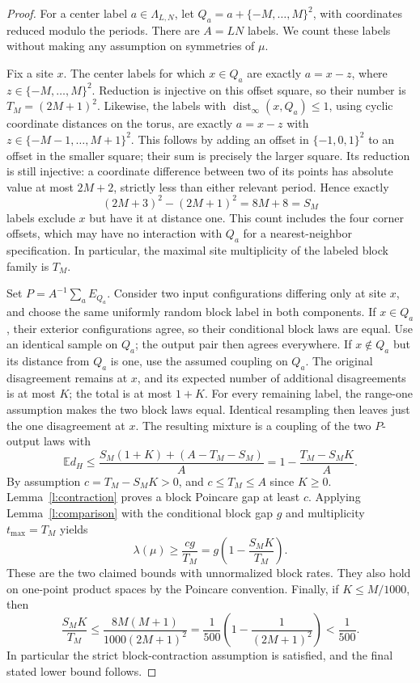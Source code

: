 \begin{proof}
For a center label \(a\in\Lambda_{L,N}\), let
\(Q_a=a+\{-M,\ldots,M\}^2\), with coordinates reduced modulo
the periods.  There are \(A=LN\) labels.  We count these labels
without making any assumption on symmetries of \(\mu\).

Fix a site \(x\).  The center labels for which \(x\in Q_a\) are
exactly \(a=x-z\), where \(z\in\{-M,\ldots,M\}^2\).
Reduction is injective on this offset square, so their number is
\(T_M=(2M+1)^2\).  Likewise, the labels with
\(\operatorname{dist}_\infty(x,Q_a)\le1\), using cyclic coordinate
distances on the torus, are exactly \(a=x-z\) with
\(z\in\{-M-1,\ldots,M+1\}^2\).  This follows by adding an
offset in \(\{-1,0,1\}^2\) to an offset in the smaller square;
their sum is precisely the larger square.  Its reduction is still
injective: a coordinate difference between two of its points has
absolute value at most \(2M+2\), strictly less than either relevant
period.  Hence exactly
\[
 (2M+3)^2-(2M+1)^2=8M+8=S_M
\]
labels exclude \(x\) but have it at distance one.  This count
includes the four corner offsets, which may have no interaction with
\(Q_a\) for a nearest-neighbor specification.  In particular, the
maximal site multiplicity of the labeled block family is \(T_M\).

Set \(P=A^{-1}\sum_aE_{Q_a}\).  Consider two input configurations
differing only at site \(x\), and choose the same uniformly random
block label in both components.  If \(x\in Q_a\), their exterior
configurations agree, so their conditional block laws are equal.
Use an identical sample on \(Q_a\); the output pair then agrees
everywhere.  If \(x\notin Q_a\) but its distance from \(Q_a\)
is one, use the assumed coupling on \(Q_a\).  The original
disagreement remains at \(x\), and its expected number of additional
disagreements is at most \(K\); the total is at most \(1+K\).
For every remaining label, the range-one assumption makes the two
block laws equal.  Identical resampling then leaves just the one
disagreement at \(x\).  The resulting mixture is a coupling of
the two \(P\)-output laws with
\[
 \mathbb E d_H
    \le\frac{S_M(1+K)+(A-T_M-S_M)}A
    =1-\frac{T_M-S_MK}A.
\]
By assumption \(c=T_M-S_MK>0\), and
\(c\le T_M\le A\) since \(K\ge0\).
Lemma~\ref{l:contraction} proves a block Poincare gap at least \(c\).
Applying Lemma~\ref{l:comparison} with the conditional block gap
\(g\) and multiplicity \(t_{\max}=T_M\) yields
\[
 \lambda(\mu)\ge\frac{cg}{T_M}
             =g\left(1-\frac{S_MK}{T_M}\right).
\]
These are the two claimed bounds with unnormalized block rates.
They also hold on one-point product spaces by the Poincare convention.
Finally, if \(K\le M/1000\), then
\[
 \frac{S_MK}{T_M}
 \le\frac{8M(M+1)}{1000(2M+1)^2}
 =\frac1{500}\left(1-\frac1{(2M+1)^2}\right)
 <\frac1{500}.
\]
In particular the strict block-contraction assumption is satisfied,
and the final stated lower bound follows.
\end{proof}



